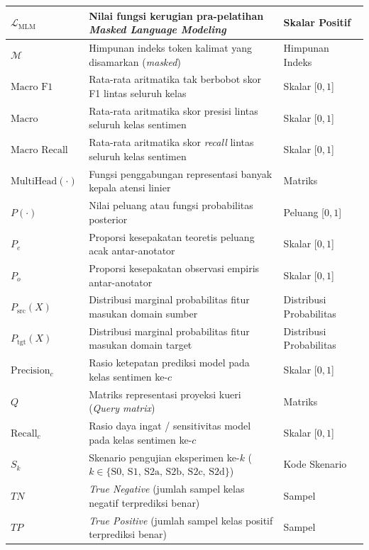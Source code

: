 \begin{longtable}{|>{\centering\arraybackslash}p{2.4cm}|>{\raggedright\arraybackslash}p{8.0cm}|>{\centering\arraybackslash}p{2.6cm}|}
    \hline
    $\mathcal{L}_{\text{MLM}}$ & Nilai fungsi kerugian pra-pelatihan \textit{Masked Language Modeling} & Skalar Positif \\
    \hline
    $\mathcal{M}$ & Himpunan indeks token kalimat yang disamarkan (\textit{masked}) & Himpunan Indeks \\
    \hline
    $\text{Macro F1}$ & Rata-rata aritmatika tak berbobot skor F1 lintas seluruh kelas & Skalar [$0, 1$] \\
    \hline
    $\text{Macro Precision}$ & Rata-rata aritmatika skor presisi lintas seluruh kelas sentimen & Skalar [$0, 1$] \\
    \hline
    $\text{Macro Recall}$ & Rata-rata aritmatika skor \textit{recall} lintas seluruh kelas sentimen & Skalar [$0, 1$] \\
    \hline
    $\text{MultiHead}(\cdot)$ & Fungsi penggabungan representasi banyak kepala atensi linier & Matriks \\
    \hline
    $P(\cdot)$ & Nilai peluang atau fungsi probabilitas posterior & Peluang [$0, 1$] \\
    \hline
    $P_e$ & Proporsi kesepakatan teoretis peluang acak antar-anotator & Skalar [$0, 1$] \\
    \hline
    $P_o$ & Proporsi kesepakatan observasi empiris antar-anotator & Skalar [$0, 1$] \\
    \hline
    $P_{\text{src}}(X)$ & Distribusi marginal probabilitas fitur masukan domain sumber & Distribusi Probabilitas \\
    \hline
    $P_{\text{tgt}}(X)$ & Distribusi marginal probabilitas fitur masukan domain target & Distribusi Probabilitas \\
    \hline
    $\text{Precision}_c$ & Rasio ketepatan prediksi model pada kelas sentimen ke-$c$ & Skalar [$0, 1$] \\
    \hline
    $Q$ & Matriks representasi proyeksi kueri (\textit{Query matrix}) & Matriks \\
    \hline
    $\text{Recall}_c$ & Rasio daya ingat / sensitivitas model pada kelas sentimen ke-$c$ & Skalar [$0, 1$] \\
    \hline
    $S_k$ & Skenario pengujian eksperimen ke-$k$ ($k \in \{\text{S0, S1, S2a, S2b, S2c, S2d}\}$) & Kode Skenario \\
    \hline
    $TN$ & \textit{True Negative} (jumlah sampel kelas negatif terprediksi benar) & Sampel \\
    \hline
    $TP$ & \textit{True Positive} (jumlah sampel kelas positif terprediksi benar) & Sampel \\

\end{longtable}
